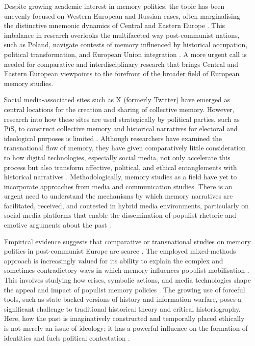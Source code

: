 Despite growing academic interest in memory politics, the topic has been unevenly focused on Western European and Russian cases, often marginalising the distinctive mnemonic dynamics of Central and Eastern Europe \citep{berger_politics_2021}. This imbalance in research overlooks the multifaceted way post-communist nations, such as Poland, navigate contests of memory influenced by historical occupation, political transformation, and European Union integration \citep{malksoo_memory_2009}. \pagebreak A more urgent call is needed for comparative and interdisciplinary research that brings Central and Eastern European viewpoints to the forefront of the broader field of European memory studies. 

Social media-associated sites such as X (formerly Twitter) have emerged as central locations for the creation and sharing of collective memory. However, research into how these sites are used strategically by political parties, such as PiS, to construct collective memory and historical narratives for electoral and ideological purposes is limited \citep{bresco_de_luna_end_2017}. Although researchers have examined the transnational flow of memory, they have given comparatively little consideration to how digital technologies, especially social media, not only accelerate this process but also transform affective, political, and ethical entanglements with historical narratives \citep{assmann_transnational_2014}. Methodologically, memory studies as a field have yet to incorporate approaches from media and communication studies. There is an urgent need to understand the mechanisms by which memory narratives are facilitated, received, and contested in hybrid media environments, particularly on social media platforms that enable the dissemination of populist rhetoric and emotive arguments about the past \citep{kansteiner_finding_2002}.

Empirical evidence suggests that comparative or transnational studies on memory politics in post-communist Europe are scarce \citep{bresco_de_luna_end_2017}. The employed mixed-methods approach is increasingly valued for its ability to explain the complex and sometimes contradictory ways in which memory influences populist mobilisation \citep{couperus_memory_2023}. This involves studying how crises, symbolic actions, and media technologies shape the appeal and impact of populist memory policies \citep{wodak_politics_2015}. The growing use of forceful tools, such as state-backed versions of history and information warfare, poses a significant challenge to traditional historical theory and critical historiography. Here, how the past is imaginatively constructed and temporally placed ethically is not merely an issue of ideology; it has a powerful influence on the formation of identities and fuels political contestation \citep{korycki_memory_2017}.

